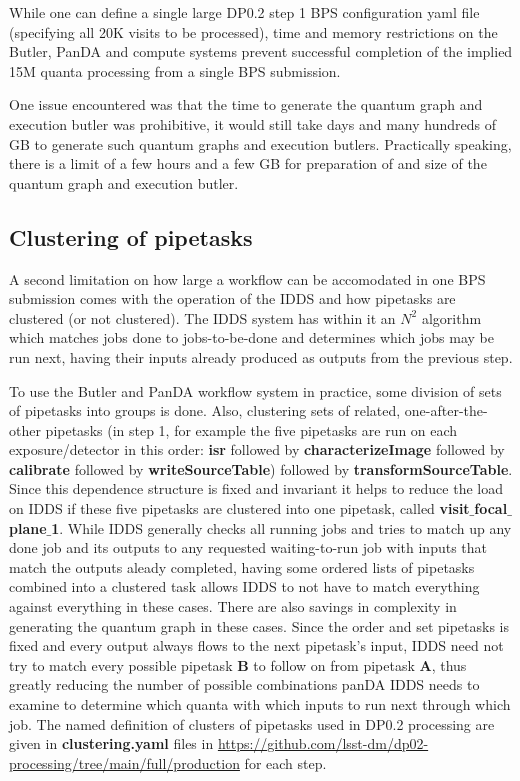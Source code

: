 \documentclass[OPS,authoryear,toc]{lsstdoc}
\begin{document}
While one can define a single large DP0.2 step 1 BPS configuration yaml file
(specifying all 20K visits to be processed), time and memory restrictions
on the Butler, PanDA and compute systems prevent successful completion of 
the implied 15M quanta processing from a single BPS submission.

One issue encountered was that the time to generate the quantum graph 
and execution butler was prohibitive, 
it would still take days and many hundreds of GB to generate such 
quantum graphs and execution butlers.  Practically speaking, 
there is a limit of a few hours and a few GB for preparation of and size of 
the quantum graph and execution butler.  

\subsection{Clustering of pipetasks}
A second limitation on how large a workflow can be accomodated in one
BPS submission comes with the operation of the IDDS and how
pipetasks are clustered (or not clustered).  The IDDS system has within 
it an $N^2$ algorithm which matches jobs done to jobs-to-be-done and 
determines which jobs may be run next, having their inputs already produced
as outputs from the previous step.

To use the Butler and PanDA workflow system in practice, some division of
sets of pipetasks into groups is done.  Also, clustering sets of related, 
one-after-the-other pipetasks (in step 1, for example the five pipetasks are 
run on each exposure/detector in this order: {\bf isr} followed by 
{\bf characterizeImage} followed by {\bf calibrate} followed by 
{\bf writeSourceTable}) followed by  {\bf transformSourceTable}.  Since this
dependence structure is fixed and invariant it helps to reduce the load 
on IDDS if these five pipetasks are clustered into one pipetask, 
called {\bf visit$\_$focal$\_$plane$\_$1}.  While IDDS generally 
checks all running jobs and tries to match up any done job and its 
outputs to any requested 
waiting-to-run job with inputs that match the outputs aleady completed, 
having some ordered lists of pipetasks combined into a clustered task
allows IDDS to not have to match everything against everything in these
cases.  There are also savings in complexity in generating the
quantum graph in these cases.
Since the order and set pipetasks is fixed and every output always 
flows to the next pipetask's input, IDDS need not try to match every 
possible pipetask {\bf B} to follow on from pipetask {\bf A}, thus greatly 
reducing the number of possible combinations panDA IDDS needs to 
examine to determine which quanta with which
inputs to run next through which job.  The named definition of clusters 
of pipetasks used in DP0.2 processing are 
given in {\bf clustering.yaml} files in 
\url{https://github.com/lsst-dm/dp02-processing/tree/main/full/production} 
for each step.  
\end{document}
